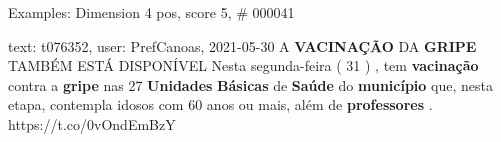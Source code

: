 \begin{frame}{Examples: Dimension 4 pos, score 5, \# 000041}
\footnotesize
\begin{exampleblock}{text: t076352, user: PrefCanoas, 2021-05-30}
A \textbf{VACINAÇÃO} DA \textbf{GRIPE} TAMBÉM ESTÁ DISPONÍVEL  
  Nesta segunda-feira ( 31 ) , tem 
\textbf{vacinação} contra a \textbf{gripe} nas 27 \textbf{Unidades} 
\textbf{Básicas} de \textbf{Saúde} do \textbf{município} que, nesta etapa, 
contempla idosos com 60 anos ou mais, além de \textbf{professores} . 
https://t.co/0vOndEmBzY 
\end{exampleblock}
\end{frame}
